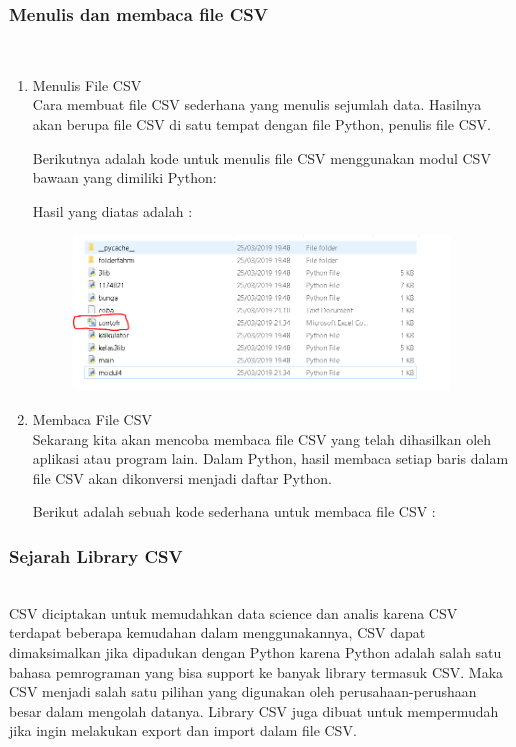 \subsubsection{Menulis dan membaca file CSV} \\
\begin{enumerate} 
	\item Menulis File CSV \\
	Cara membuat file CSV sederhana yang menulis sejumlah data. Hasilnya akan berupa file CSV di satu tempat dengan file Python, penulis file CSV.
	
	Berikutnya adalah kode untuk menulis file CSV menggunakan modul CSV bawaan yang dimiliki Python:
	
	
	
	Hasil yang diatas adalah : 
	\begin{figure}[H]
		\includegraphics[width=10cm]{figures/fahmi/8.png}
		\centering
	\end{figure}

	\item Membaca File CSV \\
	Sekarang kita akan mencoba membaca file CSV yang telah dihasilkan oleh aplikasi atau program lain. Dalam Python, hasil membaca setiap baris dalam file CSV akan dikonversi menjadi daftar Python.
	
	Berikut adalah sebuah kode sederhana untuk membaca file CSV :
	
	
\end{enumerate}


\subsubsection{Sejarah Library CSV}\\
CSV diciptakan untuk memudahkan data science dan analis karena CSV terdapat beberapa kemudahan dalam menggunakannya, CSV dapat dimaksimalkan jika dipadukan dengan Python karena Python adalah salah satu bahasa pemrograman yang bisa support ke banyak library termasuk CSV. Maka CSV menjadi salah satu pilihan yang digunakan oleh perusahaan-perushaan besar dalam mengolah datanya. Library CSV juga dibuat untuk mempermudah jika ingin melakukan export dan import dalam file CSV.

